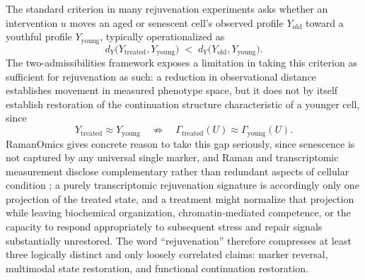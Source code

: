 \documentclass[11pt]{article}
\begin{document}
The standard criterion in many rejuvenation experiments asks whether an intervention $u$ moves an aged or senescent cell's observed profile $Y_{\text{old}}$ toward a youthful profile $Y_{\text{young}}$, typically operationalized as
\begin{equation}
d_Y\bigl(Y_{\text{treated}}, Y_{\text{young}}\bigr) \;<\; d_Y\bigl(Y_{\text{old}}, Y_{\text{young}}\bigr).
\end{equation}
The two-admissibilities framework exposes a limitation in taking this criterion as sufficient for rejuvenation as such: a reduction in observational distance establishes movement in measured phenotype space, but it does not by itself establish restoration of the continuation structure characteristic of a younger cell, since
\begin{equation}
Y_{\text{treated}} \approx Y_{\text{young}} \quad \not\Longrightarrow \quad \Gamma_{\text{treated}}(U) \approx \Gamma_{\text{young}}(U).
\end{equation}
RamanOmics gives concrete reason to take this gap seriously, since senescence is not captured by any universal single marker, and Raman and transcriptomic measurement disclose complementary rather than redundant aspects of cellular condition \cite{zhang2026,maqu2026}; a purely transcriptomic rejuvenation signature is accordingly only one projection of the treated state, and a treatment might normalize that projection while leaving biochemical organization, chromatin-mediated competence, or the capacity to respond appropriately to subsequent stress and repair signals substantially unrestored. The word ``rejuvenation'' therefore compresses at least three logically distinct and only loosely correlated claims: marker reversal, multimodal state restoration, and functional continuation restoration.
\end{document}
